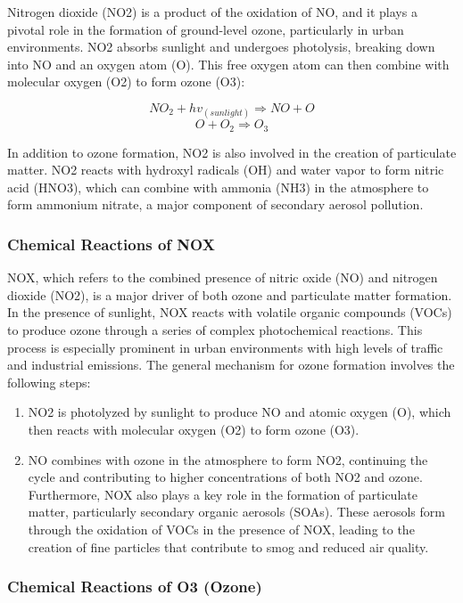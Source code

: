 \documentclass{modeleRapport}
\begin{document}
Nitrogen dioxide (NO2) is a product of the oxidation of NO, and it plays a pivotal role in the formation of ground-level 
ozone, particularly in urban environments. NO2 absorbs sunlight and undergoes photolysis, breaking down into NO and an 
oxygen atom (O). This free oxygen atom can then combine with molecular oxygen (O2) to form ozone (O3):

$$NO_2 + hv_{(sunlight)} \Rightarrow NO+O$$
$$O+O_2 \Rightarrow O_3$$

In addition to ozone formation, NO2 is also involved in the creation of particulate matter. NO2 reacts with hydroxyl 
radicals (OH) and water vapor to form nitric acid (HNO3), which can combine with ammonia (NH3) in the atmosphere to form 
ammonium nitrate, a major component of secondary aerosol pollution.\\

\subsubsection{Chemical Reactions of NOX}

NOX, which refers to the combined presence of nitric oxide (NO) and nitrogen dioxide (NO2), is a major driver of both ozone 
and particulate matter formation. In the presence of sunlight, NOX reacts with volatile organic compounds (VOCs) to produce 
ozone through a series of complex photochemical reactions. This process is especially prominent in urban environments with 
high levels of traffic and industrial emissions. The general mechanism for ozone formation involves the following steps:
\begin{enumerate}
    \item NO2 is photolyzed by sunlight to produce NO and atomic oxygen (O), which then reacts with molecular oxygen (O2) 
    to form ozone (O3).
    \item NO combines with ozone in the atmosphere to form NO2, continuing the cycle and contributing to higher 
    concentrations of both NO2 and ozone. Furthermore, NOX also plays a key role in the formation of particulate matter, 
    particularly secondary organic aerosols (SOAs). These aerosols form through the oxidation of VOCs in the presence of NOX, 
    leading to the creation of fine particles that contribute to smog and reduced air quality.\\
\end{enumerate}


\subsubsection{Chemical Reactions of O3 (Ozone)}
\end{document}
